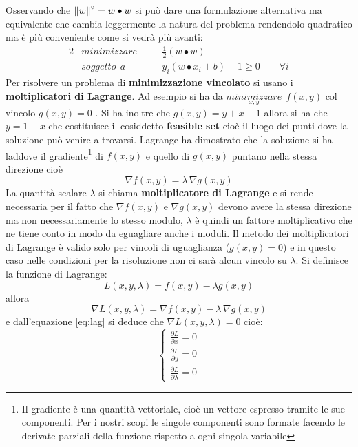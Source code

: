 Osservando che $\lVert w\rVert^{2} = w \bullet w$ si può dare una formulazione  alternativa ma equivalente che cambia leggermente la natura del problema rendendolo quadratico ma è più conveniente come si vedrà più avanti:
\begin{alignat}{2}
\label{eq:svmpro1}
&minimizzare \quad&&\frac{1}{2}(w \bullet w) \\
\label{eq:svmpro2}
&soggetto \:\:a &&y_i(w \bullet x_i +b) - 1 \geq 0 \qquad \forall i
\end{alignat}
 Per risolvere un problema di \textbf{minimizzazione vincolato} si usano i \textbf{moltiplicatori di Lagrange}. Ad esempio si ha da $\underset{x,y}{minimizzare} \:\: f(x,y)$ col vincolo $g(x,y) = 0$ . Si ha inoltre che $g(x,y) = y+x-1$ allora si ha che $y = 1 - x$ che costituisce il cosiddetto \textbf{feasible set} cioè il luogo dei punti dove la soluzione può venire a trovarsi. Lagrange ha dimostrato che la soluzione si ha laddove il gradiente\footnote{Il gradiente è una quantità vettoriale, cioè un vettore espresso tramite le sue componenti. Per i nostri scopi le singole componenti sono formate facendo le derivate parziali della funzione rispetto a ogni singola variabile}  di $f(x,y)$  e quello di $g(x,y)$ puntano nella stessa direzione cioè 
 \begin{equation}
 \label{eq:lag}
 \nabla f(x,y) = \lambda \,\nabla g(x,y)
 \end{equation}
  La quantità scalare $\lambda$ si chiama \textbf{moltiplicatore di Lagrange} e si rende necessaria per il fatto che $\nabla f(x,y) \text{ e } \nabla g(x,y)$ devono avere la stessa direzione ma non necessariamente lo stesso modulo, $\lambda$ è quindi un fattore moltiplicativo che ne tiene conto in modo da eguagliare anche i moduli. Il metodo dei moltiplicatori di Lagrange è valido solo per vincoli di uguaglianza ($g(x,y) = 0$) e in questo caso nelle condizioni per la risoluzione non ci sarà alcun vincolo su $\lambda$. Si definisce la funzione di Lagrange:
 \begin{equation*}
 L(x,y,\lambda) = f(x,y) - \lambda g(x,y) 
 \end{equation*}
 allora 
 \begin{equation*}
 \nabla L(x,y,\lambda) = \nabla f(x,y) - \lambda \, \nabla g(x,y)
 \end{equation*}
e dall'equazione \eqref{eq:lag} si deduce che $\nabla L(x,y,\lambda) = 0$ cioè:
\[
\begin{cases}
\frac{\partial L}{\partial x} = 0 \\
\frac{\partial L}{\partial y} = 0 \\
\frac{\partial L}{\partial \lambda} = 0
\end{cases}
\]
